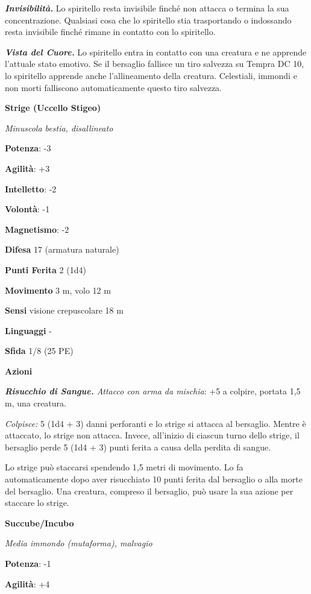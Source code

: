 \begin{multicols}{2}
\emph{\textbf{Invisibilità.}} Lo spiritello resta invisibile finché non
attacca o termina la sua concentrazione. Qualsiasi cosa che lo
spiritello stia trasportando o indossando resta invisibile finché rimane
in contatto con lo spiritello.

\emph{\textbf{Vista del Cuore.}} Lo spiritello entra in contatto con una
creatura e ne apprende l'attuale stato emotivo. Se il bersaglio fallisce
un tiro salvezza su Tempra DC 10, lo spiritello apprende anche
l'allineamento della creatura. Celestiali, immondi e non morti
falliscono automaticamente questo tiro salvezza.



\textbf{Strige (Uccello Stigeo)}

\emph{Minuscola bestia, disallineato}

\textbf{Potenza}: -3

\textbf{Agilità}: +3

\textbf{Intelletto}: -2

\textbf{Volontà}: -1

\textbf{Magnetismo}: -2

\textbf{Difesa} 17 (armatura naturale)

\textbf{Punti Ferita} 2 (1d4)

\textbf{Movimento} 3 m, volo 12 m

\textbf{Sensi} visione crepuscolare 18 m

\textbf{Linguaggi} -

\textbf{Sfida} 1/8 (25 PE)

\textbf{Azioni}

\emph{\textbf{Risucchio di Sangue.} Attacco con arma da mischia}: +5 a
colpire, portata 1,5 m, una creatura.

\emph{Colpisce:} 5 (1d4 + 3) danni perforanti e lo strige si attacca al
bersaglio. Mentre è attaccato, lo strige non attacca. Invece, all'inizio
di ciascun turno dello strige, il bersaglio perde 5 (1d4 + 3) punti
ferita a causa della perdita di sangue.

Lo strige può staccarsi spendendo 1,5 metri di movimento. Lo fa
automaticamente dopo aver risucchiato 10 punti ferita dal bersaglio o
alla morte del bersaglio. Una creatura, compreso il bersaglio, può usare
la sua azione per staccare lo strige.

\textbf{Succube/Incubo}

\emph{Media immondo (mutaforma), malvagio}

\textbf{Potenza}: -1

\textbf{Agilità}: +4


\end{multicols}
